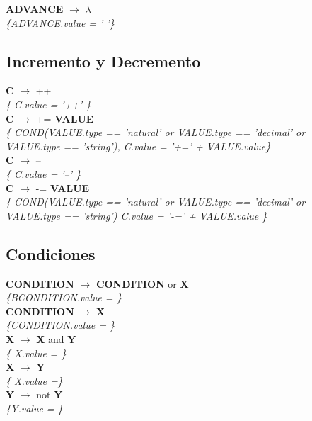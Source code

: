 \documentclass[10pt,a4paper]{article}
\begin{document}
\textbf{ADVANCE} $\rightarrow$ $\lambda$ \\
\textit{\{ADVANCE.value = ' '\}} \\


\subsection{Incremento y Decremento}
\textbf{C} $\rightarrow$ ++ \\ 
\textit{\{ C.value = '++' \}} \\

\textbf{C} $\rightarrow$ += \textbf{VALUE} \\
\textit{\{ COND(VALUE.type == 'natural' or VALUE.type ==  'decimal' or VALUE.type ==  'string'), C.value = '+=' + VALUE.value\}} \\

\textbf{C} $\rightarrow$ --  \\
\textit{\{ C.value = '--'  \}} \\

\textbf{C} $\rightarrow$ -= \textbf{VALUE} \\
\textit{\{ COND(VALUE.type == 'natural' or VALUE.type ==  'decimal' or VALUE.type ==  'string') C.value = '-=' + VALUE.value \}} \\


\subsection{Condiciones}

\textbf{CONDITION} $\rightarrow$ \textbf{CONDITION} or \textbf{X} \\
\textit{\{BCONDITION.value = \}} \\

\textbf{CONDITION} $\rightarrow$ \textbf{X} \\
\textit{\{CONDITION.value = \}} \\


\textbf{X} $\rightarrow$  \textbf{X} and \textbf{Y} \\
\textit{\{ X.value = \}} \\

\textbf{X} $\rightarrow$ \textbf{Y} \\
\textit{\{ X.value =\}} \\

\textbf{Y} $\rightarrow$ not \textbf{Y} \\
\textit{\{Y.value = \}} \\
\end{document}
